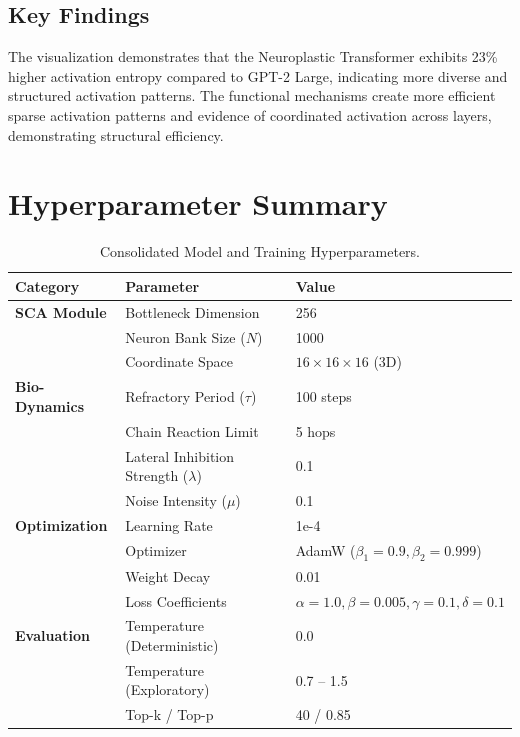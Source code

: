 \documentclass[11pt, letterpaper]{article}
\begin{document}
\subsection{Key Findings}
The visualization demonstrates that the Neuroplastic Transformer exhibits 23\% higher activation entropy compared to GPT-2 Large, indicating more diverse and structured activation patterns. The functional mechanisms create more efficient sparse activation patterns and evidence of coordinated activation across layers, demonstrating structural efficiency.

\section{Hyperparameter Summary}
\begin{table}[htbp]
    \centering
    \caption{Consolidated Model and Training Hyperparameters.}
    \label{tab:hyperparams}
    \begin{tabular}{@{} l l l @{}}
        \toprule
        \textbf{Category} & \textbf{Parameter} & \textbf{Value} \\
        \midrule
        \textbf{SCA Module} & Bottleneck Dimension & 256 \\
                            & Neuron Bank Size ($N$) & 1000 \\
                            & Coordinate Space & $16 \times 16 \times 16$ (3D) \\
        \midrule
        \textbf{Bio-Dynamics} & Refractory Period ($\tau$) & 100 steps \\
                              & Chain Reaction Limit & 5 hops \\
                              & Lateral Inhibition Strength ($\lambda$) & 0.1 \\
                              & Noise Intensity ($\mu$) & 0.1 \\
        \midrule
        \textbf{Optimization} & Learning Rate & 1e-4 \\
                              & Optimizer & AdamW ($\beta_1=0.9, \beta_2=0.999$) \\
                              & Weight Decay & 0.01 \\
                              & Loss Coefficients & $\alpha=1.0, \beta=0.005, \gamma=0.1, \delta=0.1$ \\
        \midrule
        \textbf{Evaluation}   & Temperature (Deterministic) & 0.0 \\
                              & Temperature (Exploratory) & 0.7 -- 1.5 \\
                              & Top-k / Top-p & 40 / 0.85 \\
        \bottomrule
    \end{tabular}
\end{table}
\end{document}
